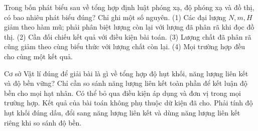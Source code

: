 \begin{ex}
Trong bốn phát biểu sau về tổng hợp định luật phóng xạ, độ phóng xạ và đồ thị, có bao nhiêu phát biểu đúng? Chỉ ghi một số nguyên. (1) Các đại lượng $N,m,H$ giảm theo hàm mũ; phải phân biệt lượng còn lại với lượng đã phân rã khi đọc đồ thị. (2) Cần đối chiếu kết quả với điều kiện bài toán. (3) Lượng chất đã phân rã cũng giảm theo cùng biểu thức với lượng chất còn lại. (4) Mọi trường hợp đều cho cùng một kết quả.
\end{ex}

\begin{ex}
Cơ sở Vật lí đúng để giải bài là gì về tổng hợp độ hụt khối, năng lượng liên kết và độ bền vững?
\choice
{Chỉ cần so sánh năng lượng liên kết toàn phần để kết luận độ bền cho mọi hạt nhân.}
{Có thể bỏ qua điều kiện áp dụng và đơn vị trong mọi trường hợp.}
{Kết quả của bài toán không phụ thuộc dữ kiện đã cho.}
{\True Phải tính độ hụt khối đúng dấu, đổi sang năng lượng liên kết và dùng năng lượng liên kết riêng khi so sánh độ bền.}
\end{ex}

